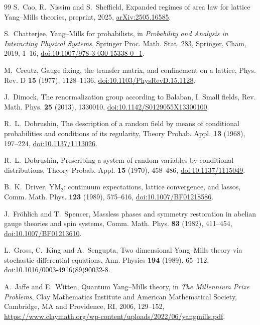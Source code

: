 \begin{thebibliography}{99}
S.~Cao, R.~Nissim and S.~Sheffield, Expanded regimes of area law for lattice Yang--Mills theories, preprint, 2025, \href{https://arxiv.org/abs/2505.16585}{arXiv:2505.16585}.

S.~Chatterjee, Yang--Mills for probabilists, in \emph{Probability and Analysis in Interacting Physical Systems}, Springer Proc. Math. Stat. 283, Springer, Cham, 2019, 1--16, \href{https://doi.org/10.1007/978-3-030-15338-0_1}{doi:10.1007/978-3-030-15338-0\_1}.

M.~Creutz, Gauge fixing, the transfer matrix, and confinement on a lattice,
Phys. Rev. D \textbf{15} (1977), 1128--1136,
\href{https://doi.org/10.1103/PhysRevD.15.1128}{doi:10.1103/PhysRevD.15.1128}.

J.~Dimock, The renormalization group according to Balaban, I. Small fields, Rev. Math. Phys. \textbf{25} (2013), 1330010, \href{https://doi.org/10.1142/S0129055X13300100}{doi:10.1142/S0129055X13300100}.

R.~L.~Dobrushin, The description of a random field by means of conditional
probabilities and conditions of its regularity, Theory Probab. Appl.
\textbf{13} (1968), 197--224,
\href{https://doi.org/10.1137/1113026}{doi:10.1137/1113026}.

R.~L.~Dobrushin, Prescribing a system of random variables by conditional
distributions, Theory Probab. Appl. \textbf{15} (1970), 458--486,
\href{https://doi.org/10.1137/1115049}{doi:10.1137/1115049}.

B.~K.~Driver, YM$_2$: continuum expectations, lattice convergence, and lassos, Comm. Math. Phys. \textbf{123} (1989), 575--616, \href{https://doi.org/10.1007/BF01218586}{doi:10.1007/BF01218586}.

J.~Fr\"ohlich and T.~Spencer, Massless phases and symmetry restoration in abelian gauge theories and spin systems, Comm. Math. Phys. \textbf{83} (1982), 411--454, \href{https://doi.org/10.1007/BF01213610}{doi:10.1007/BF01213610}.

L.~Gross, C.~King and A.~Sengupta, Two dimensional Yang--Mills theory via stochastic differential equations, Ann. Physics \textbf{194} (1989), 65--112, \href{https://doi.org/10.1016/0003-4916(89)90032-8}{doi:10.1016/0003-4916(89)90032-8}.

A.~Jaffe and E.~Witten, Quantum Yang--Mills theory, in \emph{The Millennium
Prize Problems}, Clay Mathematics Institute and American Mathematical
Society, Cambridge, MA and Providence, RI, 2006, 129--152,
\url{https://www.claymath.org/wp-content/uploads/2022/06/yangmills.pdf}.


\end{thebibliography}
